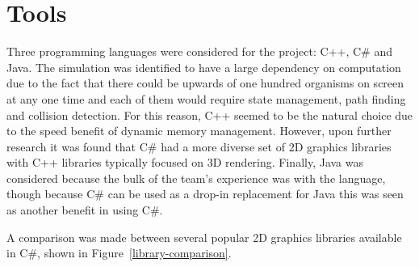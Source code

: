 \documentclass[a4paper, oneside, 11pt]{report}
\begin{document}
\section{Tools}\label{tools}
Three programming languages were considered for the project: C++, C\# and Java. The simulation was identified to have a large dependency on computation due to the fact that there could be upwards of one hundred organisms on screen at any one time and each of them would require state management, path finding and collision detection. For this reason, C++ seemed to be the natural choice due to the speed benefit of dynamic memory management. However, upon further research it was found that C\# had a more diverse set of 2D graphics libraries with C++ libraries typically focused on 3D rendering. Finally, Java was considered because the bulk of the team's experience was with the language, though because C\# can be used as a drop-in replacement for Java this was seen as another benefit in using C\#.

A comparison was made between several popular 2D graphics libraries available in C\#, shown in Figure~\ref{library-comparison}.
\end{document}
